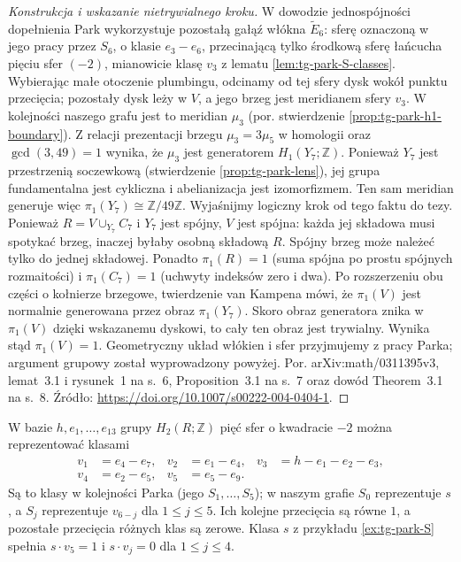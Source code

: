 \begin{proof}[Konstrukcja i wskazanie nietrywialnego kroku]
W dowodzie jednospójności dopełnienia Park wykorzystuje
pozostałą gałąź włókna $\widetilde E_6$:
sferę oznaczoną w jego pracy przez $S_6$,
o klasie $e_3-e_6$, przecinającą tylko środkową
sferę łańcucha pięciu sfer $(-2)$, mianowicie
klasę $v_3$ z lematu \ref{lem:tg-park-S-classes}.
Wybierając małe otoczenie plumbingu, odcinamy
od tej sfery dysk wokół punktu przecięcia;
pozostały dysk leży w $V$, a jego brzeg
jest meridianem sfery $v_3$.
W kolejności naszego grafu jest to meridian
$\mu_3$ (por. stwierdzenie
\ref{prop:tg-park-h1-boundary}).
Z relacji prezentacji brzegu
$\mu_3=3\mu_5$ w homologii oraz
$\gcd(3,49)=1$ wynika, że $\mu_3$ jest
generatorem $H_1(Y_7;\mathbb Z)$.
Ponieważ $Y_7$ jest przestrzenią soczewkową
(stwierdzenie \ref{prop:tg-park-lens}),
jej grupa fundamentalna jest cykliczna
i abelianizacja jest izomorfizmem.
Ten sam meridian generuje więc
$\pi_1(Y_7)\cong\mathbb Z/49\mathbb Z$.
Wyjaśnijmy logiczny krok od tego faktu do tezy.
Ponieważ $R=V\cup_{Y_7} C_7$ i $Y_7$ jest spójny,
$V$ jest spójna: każda jej składowa musi spotykać
brzeg, inaczej byłaby osobną składową $R$.
Spójny brzeg może należeć tylko do jednej składowej.
Ponadto $\pi_1(R)=1$ (suma spójna po prostu spójnych
rozmaitości) i $\pi_1(C_7)=1$ (uchwyty indeksów
zero i dwa). Po rozszerzeniu obu części o kołnierze
brzegowe, twierdzenie van Kampena
mówi, że $\pi_1(V)$ jest normalnie generowana przez
obraz $\pi_1(Y_7)$. Skoro obraz generatora znika w
$\pi_1(V)$ dzięki wskazanemu dyskowi, to cały ten obraz
jest trywialny. Wynika stąd $\pi_1(V)=1$.
Geometryczny układ włókien i sfer przyjmujemy
z pracy Parka; argument grupowy został wyprowadzony
powyżej. Por. arXiv:math/0311395v3, lemat~3.1
i rysunek~1 na s.~6, Proposition~3.1 na s.~7
oraz dowód Theorem~3.1 na s.~8.
Źródło: \url{https://doi.org/10.1007/s00222-004-0404-1}.
\end{proof}


\begin{lemat}
\label{lem:tg-park-S-classes}
W bazie $h,e_1,\ldots,e_{13}$ grupy $H_2(R;\mathbb Z)$
pięć sfer o kwadracie $-2$ można reprezentować klasami
\[
\begin{aligned}
 v_1&=e_4-e_7,& v_2&=e_1-e_4,&
 v_3&=h-e_1-e_2-e_3,\\
 v_4&=e_2-e_5,& v_5&=e_5-e_9.
\end{aligned}
\]
Są to klasy w kolejności Parka (jego $S_1,\ldots,S_5$);
w naszym grafie $S_0$ reprezentuje $s$, a $S_j$
reprezentuje $v_{6-j}$ dla $1\le j\le5$.
Ich kolejne przecięcia są równe $1$, a pozostałe przecięcia
różnych klas są zerowe. Klasa $s$ z przykładu
\ref{ex:tg-park-S} spełnia $s\cdot v_5=1$ i
$s\cdot v_j=0$ dla $1\le j\le4$.
\end{lemat}

